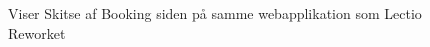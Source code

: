         \begin{figure}[H]
            \centering
            \caption{Viser Skitse af Booking siden på samme webapplikation som Lectio Reworket}
        \end{figure}
        